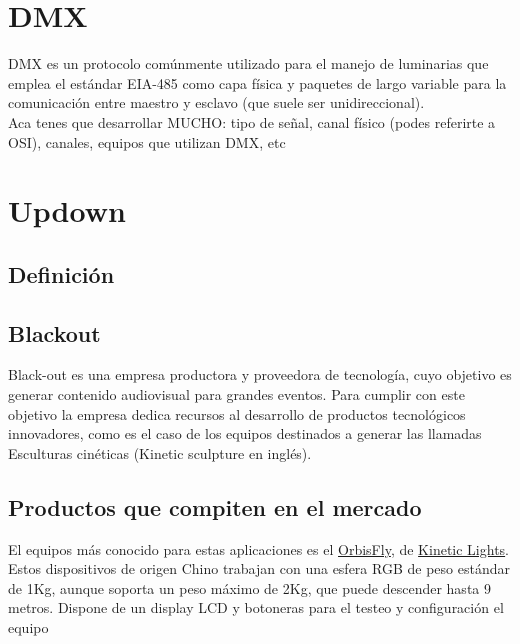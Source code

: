 \section{DMX}
DMX es un protocolo comúnmente utilizado para el manejo de luminarias que emplea el estándar EIA-485 como capa física y paquetes de largo variable para la comunicación entre maestro y esclavo (que suele ser unidireccional).\\

\textcolor{FIXME}{Aca tenes que desarrollar MUCHO: tipo de señal, canal físico (podes referirte a OSI), canales, equipos que utilizan DMX, etc}

\section{Updown}
\subsection{Definición}


\subsection{Blackout}
Black-out es una empresa productora y proveedora de tecnología, cuyo objetivo es generar contenido audiovisual para grandes eventos. Para cumplir con este objetivo la empresa dedica recursos al desarrollo de productos tecnológicos innovadores, como es el caso de los equipos destinados a generar las llamadas Esculturas cinéticas (Kinetic sculpture en inglés).\\

\subsection{Productos que compiten en el mercado}
El equipos más conocido para estas aplicaciones es el \href{http://www.eastsunlite.com/p31.html}{OrbisFly}, de \href{https://www.kinetic-lights.com/}{Kinetic Lights}. Estos dispositivos de origen Chino trabajan con una esfera RGB de peso estándar de 1Kg, aunque soporta un peso máximo de 2Kg, que puede descender hasta 9 metros. Dispone de un display LCD y botoneras para el testeo y configuración el equipo\\




\newpage
